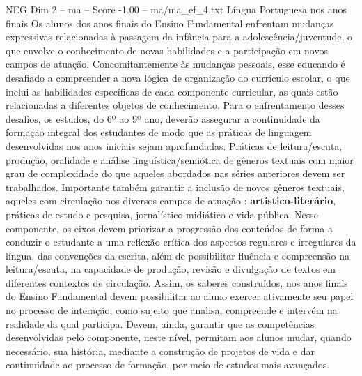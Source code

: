 \begin{textsample}{NEG Dim 2 – ma – Score -1.00 – ma/ma\_ef\_4.txt}  \label{ex:f2_neg_233}
Língua Portuguesa nos anos finais Os alunos dos anos finais do Ensino Fundamental enfrentam mudanças expressivas relacionadas à passagem da infância para a adolescência/juventude, o que envolve o conhecimento de novas habilidades e a participação em novos campos de atuação.
Concomitantemente às mudanças pessoais, esse educando é desafiado a compreender a nova lógica de organização do currículo escolar, o que inclui as habilidades específicas de cada componente curricular, as quais estão relacionadas a diferentes objetos de conhecimento.
Para o enfrentamento desses desafios, os estudos, do 6º ao 9º ano, deverão assegurar a continuidade da formação integral dos estudantes de modo que as práticas de linguagem desenvolvidas nos anos iniciais sejam aprofundadas.
Práticas de leitura/escuta, produção, oralidade e análise linguística/semiótica de gêneros textuais com maior grau de complexidade do que aqueles abordados nas séries anteriores devem ser trabalhados.
Importante também garantir a inclusão de novos gêneros textuais, aqueles com circulação nos diversos campos de atuação : \textbf{artístico-literário}, práticas de estudo e pesquisa, jornalístico-midiático e vida pública.
Nesse componente, os eixos devem priorizar a progressão dos conteúdos de forma a conduzir o estudante a uma reflexão crítica dos aspectos regulares e irregulares da língua, das convenções da escrita, além de possibilitar fluência e compreensão na leitura/escuta, na capacidade de produção, revisão e divulgação de textos em diferentes contextos de circulação.
Assim, os saberes construídos, nos anos finais do Ensino Fundamental devem possibilitar ao aluno exercer ativamente seu papel no processo de interação, como sujeito que analisa, compreende e intervém na realidade da qual participa.
Devem, ainda, garantir que as competências desenvolvidas pelo componente, neste nível, permitam aos alunos mudar, quando necessário, sua história, mediante a construção de projetos de vida e dar continuidade ao processo de formação, por meio de estudos mais avançados.

\end{textsample}
